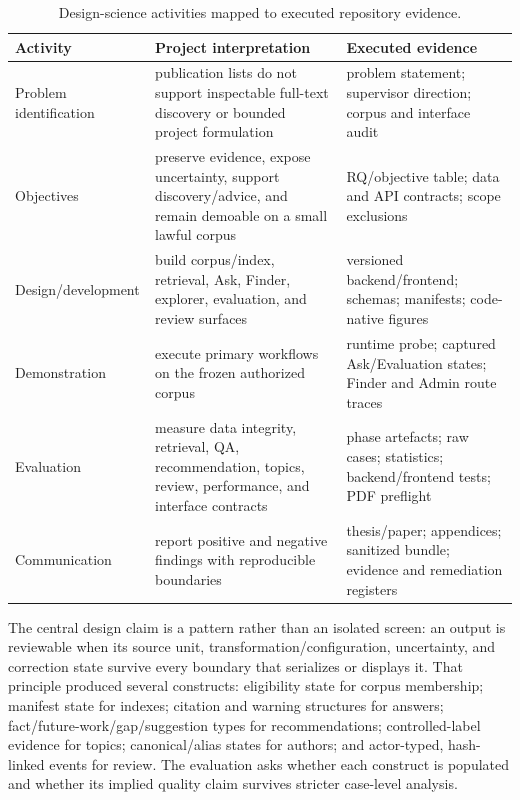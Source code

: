 \begin{table}[htbp]
\centering
\small
\caption{Design-science activities mapped to executed repository evidence.}
\label{tab:dsrm-map}
\begin{tabularx}{\textwidth}{P{35mm}P{48mm}Y}
\toprule
Activity & Project interpretation & Executed evidence \\
\midrule
Problem identification & publication lists do not support inspectable full-text discovery or bounded project formulation & problem statement; supervisor direction; corpus and interface audit \\
Objectives & preserve evidence, expose uncertainty, support discovery/advice, and remain demoable on a small lawful corpus & RQ/objective table; data and API contracts; scope exclusions \\
Design/development & build corpus/index, retrieval, Ask, Finder, explorer, evaluation, and review surfaces & versioned backend/frontend; schemas; manifests; code-native figures \\
Demonstration & execute primary workflows on the frozen authorized corpus & runtime probe; captured Ask/Evaluation states; Finder and Admin route traces \\
Evaluation & measure data integrity, retrieval, QA, recommendation, topics, review, performance, and interface contracts & phase artefacts; raw cases; statistics; backend/frontend tests; PDF preflight \\
Communication & report positive and negative findings with reproducible boundaries & thesis/paper; appendices; sanitized bundle; evidence and remediation registers \\
\bottomrule
\end{tabularx}
\end{table}

The central design claim is a pattern rather than an isolated screen: an output is reviewable when its source unit, transformation/configuration, uncertainty, and correction state survive every boundary that serializes or displays it. That principle produced several constructs: eligibility state for corpus membership; manifest state for indexes; citation and warning structures for answers; fact/future-work/gap/suggestion types for recommendations; controlled-label evidence for topics; canonical/alias states for authors; and actor-typed, hash-linked events for review. The evaluation asks whether each construct is populated and whether its implied quality claim survives stricter case-level analysis.


